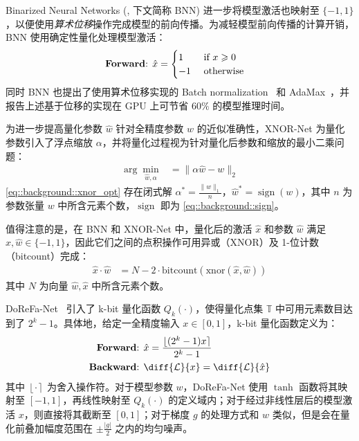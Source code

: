 \documentclass[
  fontset = mac,
]{shtthesis}
\providecommand{\Round}[1]{\left\lfloor #1 \right\rceil}
\DeclareMathOperator{\sign}{sign}
\begin{document}
Binarized Neural Networks (\citet{hubara2016binarized}, 下文简称 BNN) 进一步将模型激活也映射至 $\{-1, 1\}$，以便使用\emph{算术位移}操作完成模型的前向传播。为减轻模型前向传播的计算开销，BNN 使用确定性量化处理模型激活：
\begin{align}
  \text{\textbf{Forward}: } & \hat{x} = 
    \begin{cases} 
      1 & \text{ if } x \ge 0 \\
      -1 & \text{ otherwise}
    \end{cases}
    \label{eq::background::sign}
\end{align}
同时 BNN 也提出了使用算术位移实现的 Batch normalization~\citep{ioffe2015batch} 和 AdaMax~\citep{kingma2014adam}，并报告上述基于位移的实现在 GPU 上可节省 $60\%$ 的模型推理时间。

为进一步提高量化参数 $\hat{w}$ 针对全精度参数 $w$ 的近似准确性，XNOR-Net \citep{rastegari2016xnor} 为量化参数引入了浮点缩放 $\alpha$，并将量化过程视为针对量化后参数和缩放的最小二乘问题：
\begin{align}
\arg\min_{\hat{w}, \alpha} &= \| \alpha\hat{w} - w \|_2 \label{eq::background::xnor_opt}
\end{align}
\eqref{eq::background::xnor_opt} 存在闭式解 $\alpha^* = \frac{\|w\|_1}{n}$，$\hat{w}^* = \sign(w)$，其中 $n$ 为参数张量 $w$ 中所含元素个数，$\sign$ 即为 \eqref{eq::background::sign}。

值得注意的是，在 BNN 和 XNOR-Net 中，量化后的激活 $\hat{x}$ 和参数 $\hat{w}$ 满足 $\hat{x}, \hat{w} \in \{-1, 1\}$，因此它们之间的点积操作可用异或（XNOR）及 1-位计数（bitcount）完成：
\begin{align}
  \hat{x} \cdot \hat{w} &= N - 2 \cdot \mathrm{bitcount}(\mathrm{xnor}(\hat{x}, \hat{w})) \label{eq::background::xnor_dot}
\end{align}
其中 $N$ 为向量 $\hat{w}, \hat{x}$ 中所含元素个数。

DoReFa-Net~\citep{zhou2016dorefanet} 引入了 k-bit 量化函数 $Q_k(\cdot)$，使得量化点集 $\mathbb{T}$ 中可用元素数目达到了 $2^k-1$。具体地，给定一全精度输入 $x\in [0, 1]$，k-bit 量化函数定义为：
\begin{align}
  \text{\textbf{Forward}: } & \hat{x} = \frac{\lfloor (2^k - 1)x \rceil}{2^k - 1} \label{eq::background::dorefa_fwd} \\
  \text{\textbf{Backward}: } & \diff{\mathcal{L}}{x} = \diff{\mathcal{L}}{\hat{x}}
\end{align}
其中 $\Round{\cdot}$ 为舍入操作符。对于模型参数 $w$，DoReFa-Net 使用 $\tanh$ 函数将其映射至 $[-1, 1]$，再线性映射至 $Q_k(\cdot)$ 的定义域内；对于经过非线性层后的模型激活 $x$，则直接将其截断至 $[0, 1]$；对于梯度 $g$ 的处理方式和 $w$ 类似，但是会在量化前叠加幅度范围在 $\pm \frac{|g|}{2}$ 之内的均匀噪声。
\end{document}
